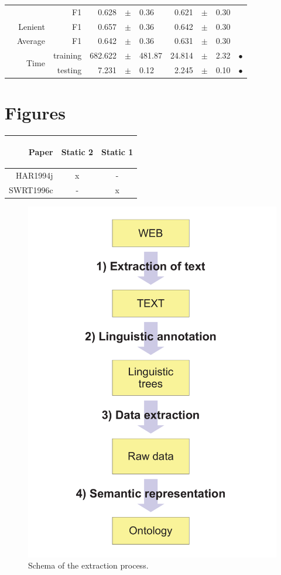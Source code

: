 \begin{longtable}{|r|r|r||rcl|rcl|c|}
\cline{3-10}
  &  &  F1  & 0.628 &  $\pm$  & 0.36 & 0.621 &  $\pm$  & 0.30 &  \\
\cline{2-10}
  & Lenient &  F1  & 0.657 &  $\pm$  & 0.36 & 0.642 &  $\pm$  & 0.30 &  \\
\cline{2-10}
  & Average &  F1  & 0.642 &  $\pm$  & 0.36 & 0.631 &  $\pm$  & 0.30 &  \\
\cline{2-10}
  & \multirow{2}{*}{Time} &  training  & 682.622 &  $\pm$  & 481.87 & 24.814 &  $\pm$  & 2.32 &  $\bullet$\\
\cline{3-10}
  &  &  testing  & 7.231 &  $\pm$  & 0.12 & 2.245 &  $\pm$  & 0.10 &  $\bullet$\\
\hline
\end{longtable}






\section{Figures}


\begin{tabular}{|r|c|c|}\hline
Paper &\begin{sideways}Static 2\end{sideways} &\begin{sideways}Static 1\end{sideways}\\
\hline
HAR1994j & x & -\\
SWRT1996c & - & x\\
\hline
\end{tabular}


\begin{figure}
	\centering
		\includegraphics[width=0.2\hsize]{../img/ch3_ap_schema}
	\caption{Schema of the extraction process.}
	\label{fig:ch3_ap_schema}
\end{figure}


